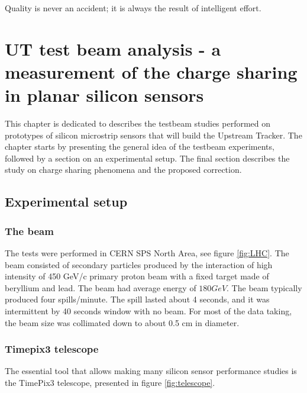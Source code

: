 \begin{savequote}[75mm] 
Quality is never an accident; it is always the result of intelligent effort. 
\end{savequote}


\chapter{UT test beam analysis - a measurement of the charge sharing
in planar silicon sensors}
\label{chapter:testbeam}

This chapter is dedicated to describes the testbeam studies performed on prototypes of silicon microstrip sensors that will build the Upstream Tracker.  The chapter starts by presenting the general idea of the testbeam experiments, followed by a section on an experimental setup. The final section describes the study on charge sharing phenomena and the proposed correction. 

\section{Experimental setup}

\subsection{The beam}
The tests were performed in CERN SPS North Area, see figure \ref{fig:LHC}. The beam consisted of secondary particles produced by the interaction of high intensity of 450 GeV/c primary proton beam with a fixed target made of beryllium and lead. The beam had average energy of $180 GeV$.  
The beam typically produced four spills/minute. The spill lasted about 4 seconds, and it was intermittent by 40 seconds window with no beam. For most of the data taking, the beam size was collimated down to about 0.5 cm in diameter.

\subsection{Timepix3 telescope}
The essential tool that allows making many silicon sensor performance studies is the TimePix3 telescope, presented in figure \ref{fig:telescope}. 


